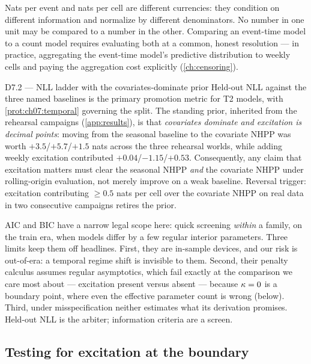 \begin{warning}\label{warn:ch07:units}
Nats per event and nats per cell are different currencies: they condition
on different information and normalize by different denominators. No
number in one unit may be compared to a number in the other. Comparing an
event-time model to a count model requires evaluating both at a common,
honest resolution --- in practice, aggregating the event-time model's
predictive distribution to weekly cells and paying the aggregation cost
explicitly (\cref{ch:censoring}).
\end{warning}

\begin{decision}{D7.2 --- NLL ladder with the covariates-dominate prior}
Held-out NLL against the three named baselines is the primary promotion
metric for T2 models, with \cref{prot:ch07:temporal} governing the split.
The standing prior, inherited from the rehearsal campaigns
(\cref{app:results}), is that \emph{covariates dominate and excitation is
decimal points}: moving from the seasonal baseline to the covariate NHPP
was worth $+3.5$/$+5.7$/$+1.5$ nats across the three rehearsal worlds,
while adding weekly excitation contributed $+0.04$/$-1.15$/$+0.53$.
Consequently, any claim that excitation matters must clear the seasonal
NHPP \emph{and} the covariate NHPP under rolling-origin evaluation, not
merely improve on a weak baseline. Reversal trigger: excitation
contributing $\ge 0.5$ nats per cell over the covariate NHPP on real data
in two consecutive campaigns retires the prior.
\end{decision}

AIC and BIC have a narrow legal scope here: quick screening \emph{within}
a family, on the train era, when models differ by a few regular interior
parameters. Three limits keep them off headlines. First, they are
in-sample devices, and our risk is out-of-era: a temporal regime shift is
invisible to them. Second, their penalty calculus assumes regular
asymptotics, which fail exactly at the comparison we care most about ---
excitation present versus absent --- because $\kappa=0$ is a boundary
point, where even the effective parameter count is wrong (below). Third,
under misspecification neither estimates what its derivation promises.
Held-out NLL is the arbiter; information criteria are a screen.

\subsection{Testing for excitation at the boundary}\label{ch07:sec:boundary}

